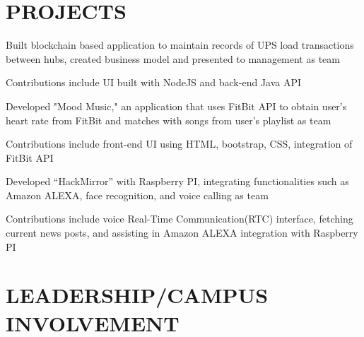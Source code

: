 \documentclass[]{deedy-resume-openfont}
\begin{document}
\begin{minipage}[t]{0.67\textwidth}

\section {PROJECTS}

\begin{tightemize}
\item Built blockchain based application to maintain records of UPS load transactions between hubs, created business model and presented to management as team
\item Contributions include UI built with NodeJS and back-end Java API
\end{tightemize}
\sectionsep

\descript{}
\begin{tightemize}
\item Developed "Mood Music," an application that uses FitBit API to obtain user's heart rate from FitBit and matches with songs from user's playlist as team
\item Contributions include front-end UI using HTML, bootstrap, CSS, integration of FitBit API
\end{tightemize}
\sectionsep

\begin{tightemize}
\item Developed “HackMirror” with Raspberry PI, integrating functionalities such as Amazon ALEXA, face recognition, and voice calling as team
\item Contributions include voice Real-Time Communication(RTC) interface, fetching current news posts, and assisting in Amazon ALEXA integration with Raspberry PI
\end{tightemize}
\sectionsep

\section{LEADERSHIP/CAMPUS INVOLVEMENT} 



\sectionsep

\sectionsep

\end{minipage} 
\end{document}
